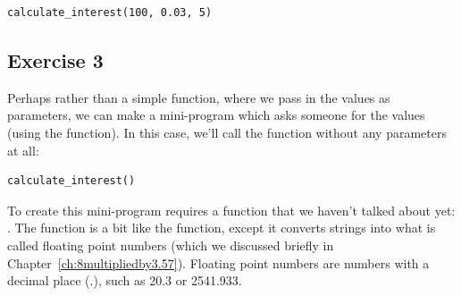 \begin{listing}
\begin{verbatim}
calculate_interest(100, 0.03, 5)
\end{verbatim}
\end{listing}

\subsection*{Exercise 3}
Perhaps rather than a simple function, where we pass in the values as parameters, we can make a mini-program which asks someone for the values (using the  function).  In this case, we'll call the function without any parameters at all:

\begin{listing}
\begin{verbatim}
calculate_interest()
\end{verbatim}
\end{listing}

\noindent
To create this mini-program requires a function that we haven't talked about yet: . The  function is a bit like the  function, except it converts strings into what is called floating point numbers (which we discussed briefly in Chapter~\ref{ch:8multipliedby3.57}).  Floating point numbers are numbers with a decimal place (.), such as 20.3 or 2541.933.

\newpage
